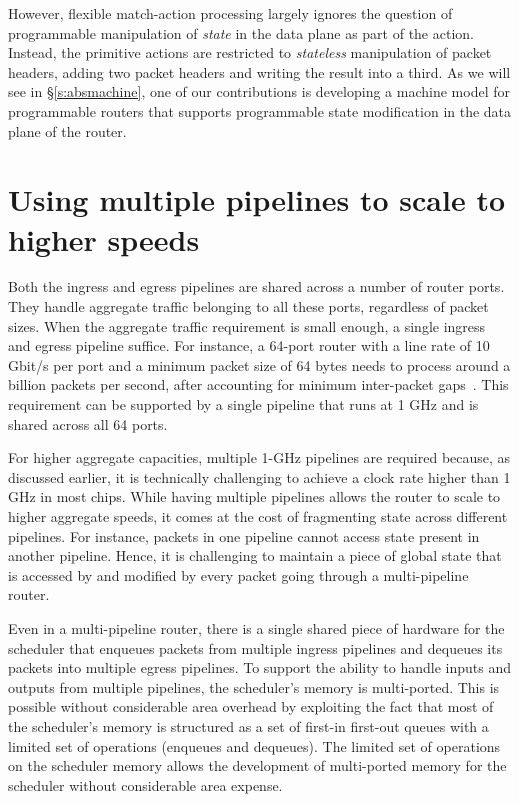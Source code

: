 However, flexible match-action processing largely ignores the question of
programmable manipulation of {\em state} in the data plane as part of the
action.  Instead, the primitive actions are restricted to {\em stateless}
manipulation of packet headers, \eg adding two packet headers and writing the
result into a third. As we will see in \S\ref{s:absmachine}, one of our
contributions is developing a machine model for programmable routers that
supports programmable state modification in the data plane of the router. 

\section{Using multiple pipelines to scale to higher speeds}
Both the ingress and egress pipelines are shared across a number of router
ports.  They handle aggregate traffic belonging to all these ports, regardless
of packet sizes. When the aggregate traffic requirement is small enough, a
single ingress and egress pipeline suffice. For instance, a 64-port router with
a line rate of 10 Gbit/s per port and a minimum packet size of 64 bytes needs
to process around a billion packets per second, after accounting for minimum
inter-packet gaps~\cite{rmt}.  This requirement can be supported by a single
pipeline that runs at 1 GHz and is shared across all 64 ports.

For higher aggregate capacities, multiple 1-GHz pipelines are required because,
as discussed earlier, it is technically challenging to achieve a clock rate
higher than 1 GHz in most chips. While having multiple pipelines allows the
router to scale to higher aggregate speeds, it comes at the cost of fragmenting
state across different pipelines.  For instance, packets in one pipeline cannot
access state present in another pipeline. Hence, it is challenging to maintain
a piece of global state that is accessed by and modified by every packet going
through a multi-pipeline router.

Even in a multi-pipeline router, there is a single shared piece of hardware for
the scheduler that enqueues packets from multiple ingress pipelines and
dequeues its packets into multiple egress pipelines. To support the ability to
handle inputs and outputs from multiple pipelines, the scheduler's memory is
multi-ported.  This is possible without considerable area overhead by
exploiting the fact that most of the scheduler's memory is structured as a set
of first-in first-out queues with a limited set of operations (\eg enqueues and
dequeues). The limited set of operations on the scheduler memory allows the
development of multi-ported memory for the scheduler without considerable area
expense.

